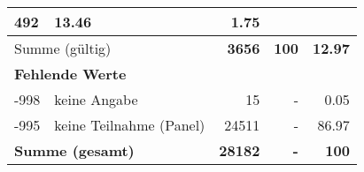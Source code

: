 \begin{longtable}{lXrrr}
       \num{492} &
       \num[round-mode=places,round-precision=2]{13.46} &
         \num[round-mode=places,round-precision=2]{1.75} \\
     \midrule
     \multicolumn{2}{l}{Summe (gültig)} &
       \textbf{\num{3656}} &
     \textbf{100} &
       \textbf{\num[round-mode=places,round-precision=2]{12.97}} \\
     \multicolumn{5}{l}{\textbf{Fehlende Werte}}\\
       -998 &
       keine Angabe &
         \num{15} &
        - &
         \num[round-mode=places,round-precision=2]{0.05} \\
       -995 &
       keine Teilnahme (Panel) &
         \num{24511} &
        - &
         \num[round-mode=places,round-precision=2]{86.97} \\
     \midrule
     \multicolumn{2}{l}{\textbf{Summe (gesamt)}} &
          \textbf{\num{28182}} &
        \textbf{-} &
        \textbf{100} \\
     \bottomrule
     \end{longtable}
     
